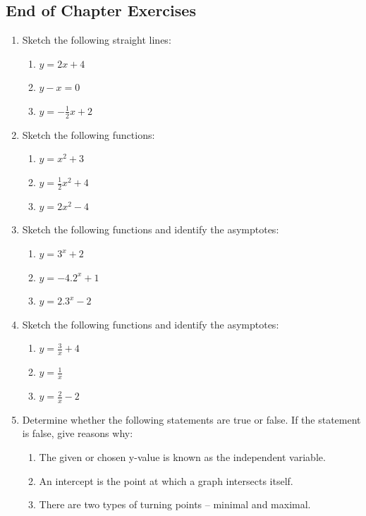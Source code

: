 \begin{enumerate}[noitemsep, label=\textbf{\arabic*}. ]
\section{End of Chapter Exercises}
\nopagebreak
\begin{enumerate}[noitemsep, label=\textbf{\arabic*}. ] 
\item Sketch the following straight lines: 
    \begin{enumerate}[noitemsep, label=\textbf{\alph*}. ] 
    \item $y=2x+4$ 
    \item $y-x=0$ 
    \item $y=-\frac{1}{2}x+2$
    \end{enumerate}
\item Sketch the following functions: 
    \begin{enumerate}[noitemsep, label=\textbf{\alph*}. ] 
    \item $y={x}^{2}+3$ 
    \item $y=\frac{1}{2}{x}^{2}+4$
    \item $y=2{x}^{2}-4$
    \end{enumerate}
\item Sketch the following functions and identify the asymptotes: 
    \begin{enumerate}[noitemsep, label=\textbf{\alph*}. ] 
    \item $y={3}^{x}+2$ 
    \item $y=-4.{2}^{x}+1$ 
    \item $y=2.{3}^{x}-2$ 
    \end{enumerate}
\item Sketch the following functions and identify the asymptotes: 
    \begin{enumerate}[noitemsep, label=\textbf{\alph*}. ] 
    \item $y=\frac{3}{x}+4$ 
    \item $y=\frac{1}{x}$ 
    \item $y=\frac{2}{x}-2$ 
    \end{enumerate}
\item Determine whether the following statements are true or false. If the statement is false, give reasons why:
    \begin{enumerate}[noitemsep, label=\textbf{\alph*}. ] 
    \item The given or chosen y-value is known as the independent variable.
    \item An intercept is the point at which a graph intersects itself.
    \item There are two types of turning points -- minimal and maximal.

\end{enumerate}
\end{enumerate}
\end{enumerate}
